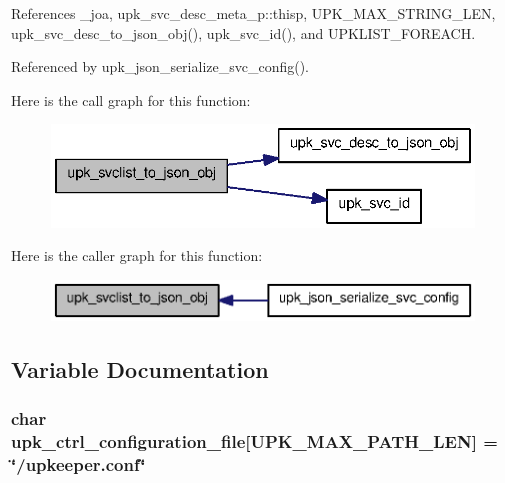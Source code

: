 References \_\-joa, upk\_\-svc\_\-desc\_\-meta\_\-p::thisp, UPK\_\-MAX\_\-STRING\_\-LEN, upk\_\-svc\_\-desc\_\-to\_\-json\_\-obj(), upk\_\-svc\_\-id(), and UPKLIST\_\-FOREACH.



Referenced by upk\_\-json\_\-serialize\_\-svc\_\-config().



Here is the call graph for this function:
\nopagebreak
\begin{figure}[H]
\begin{center}
\leavevmode
\includegraphics[width=334pt]{group__config__impl_ga82376799c5e86edd919376c308139d8b_cgraph}
\end{center}
\end{figure}




Here is the caller graph for this function:
\nopagebreak
\begin{figure}[H]
\begin{center}
\leavevmode
\includegraphics[width=350pt]{group__config__impl_ga82376799c5e86edd919376c308139d8b_icgraph}
\end{center}
\end{figure}




\subsection{Variable Documentation}
\subsubsection[{upk\_\-ctrl\_\-configuration\_\-file}]{\setlength{\rightskip}{0pt plus 5cm}char {\bf upk\_\-ctrl\_\-configuration\_\-file}[UPK\_\-MAX\_\-PATH\_\-LEN] = \char`\"{}/upkeeper.conf\char`\"{}}\label{group__config__impl_ga60eaf9d484f5d0b644ff676f986debd0}


